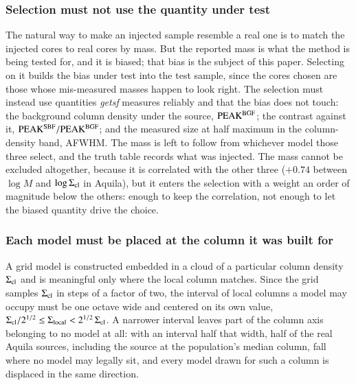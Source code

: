 \documentclass{aa}
\newcommand{\Scloud}{\Sigma_{\rm cl}}
\begin{document}
\subsubsection{Selection must not use the quantity under test}
The natural way to make
an injected sample resemble a real one is to match the injected cores to real
cores by mass. But the reported mass is what the method is being tested for,
and it is biased; that bias is the subject of this paper. Selecting on it
builds the bias under test into the test sample, since the cores chosen are
those whose mis-measured masses happen to look right. The selection must
instead use quantities \emph{getsf} measures reliably and that the bias does
not touch: the background column density under the source,
${\rm PEAK^{BGF}}$; the contrast against it,
${\rm PEAK^{SBF}}/{\rm PEAK^{BGF}}$; and the measured size at half
maximum in the column-density band, AFWHM. The mass is left to follow from
whichever model those three select, and the truth table records what was
injected. The mass cannot be excluded altogether, because it is correlated
with the other three ($+0.74$ between $\log M$ and $\log\Scloud$ in Aquila),
but it enters the selection with a weight an order of magnitude below the
others: enough to keep the correlation, not enough to let the biased quantity
drive the choice.

\subsubsection{Each model must be placed at the column it was built for}
A grid model
is constructed embedded in a cloud of a particular column density $\Scloud$
and is meaningful only where the local column matches. Since the grid samples
$\Scloud$ in steps of a factor of two, the interval of local columns a model
may occupy must be one octave wide and centered on its own value,
$\Scloud/2^{1/2} \le \Sigma_{\rm local} < 2^{1/2}\,\Scloud$. A narrower
interval leaves part of the column axis belonging to no model at all: with an
interval half that width, half of the real Aquila sources, including the
source at the population's median column, fall where no model may legally sit,
and every model drawn for such a column is displaced in the same direction.
\end{document}
